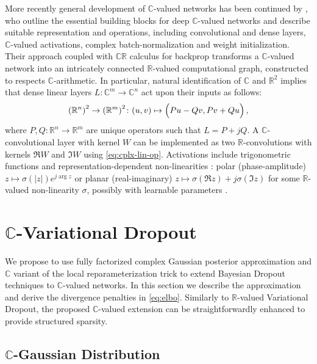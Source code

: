\documentclass[a4paper,10pt,onecolumn]{article}
\newcommand{\real}{\mathbb{R}}
\newcommand{\cplx}{\mathbb{C}}
\begin{document}
More recently general development of $\cplx$-valued networks has been continued by
\citet{trabelsi_deep_2017}, who outline the essential building blocks for deep $\cplx$-valued
networks and describe suitable representation and operations, including convolutional and
dense layers, $\cplx$-valued activations, complex batch-normalization and weight initialization.
Their approach coupled with $\cplx\real$ calculus for backprop transforms a $\cplx$-valued
network into an intricately connected $\real$-valued computational graph, constructed
to respects $\cplx$-arithmetic.
%
In particular, natural identification of $\cplx$ and $\real^2$ implies that dense linear
layers $
  L \colon \cplx^m \to \cplx^n
$ act upon their inputs as follows:
\begin{equation}  \label{eq:cplx-lin-op}
  {(\real^n)}^{2}
    \to {(\real^m)}^{2}
    \colon (u, v)
      \mapsto \Bigl(
        P u - Q v,
        P v + Q u
      \Bigr)
    \,,
\end{equation}
where $
  P, Q \colon \real^{n} \to \real^{m}
$ are unique operators such that $L = P + j Q$. A $\cplx$-convolutional layer with kernel
$W$ can be implemented as two $\real$-convolutions with kernels $\Re{W}$ and $\Im{W}$ using
\eqref{eq:cplx-lin-op}. Activations include trigonometric functions and representation-dependent
non-linearities \citep{hirose_complex-valued_2009}: polar (phase-amplitude) $
  z \mapsto \sigma(\lvert z \rvert) e^{j \arg z}
$ or planar (real-imaginary) $
  z \mapsto \sigma(\Re z) + j \sigma(\Im z)
$ for some $\real$-valued non-linearity $\sigma$, possibly with learnable parameters
\citep{trabelsi_deep_2017,wolter_complex_2018}.



\section{$\cplx$-Variational Dropout} %
\label{sec:c_variational_dropout}

We propose to use fully factorized complex Gaussian posterior approximation and $\cplx$
variant of the local reparameterization trick to extend Bayesian Dropout techniques to
$\cplx$-valued networks. In this section we describe the approximation and derive the
divergence penalties in \eqref{eq:elbo}. Similarly to $\real$-valued Variational Dropout,
the proposed $\cplx$-valued extension can be straightforwardly enhanced to provide
structured sparsity.


\subsection{$\cplx$-Gaussian Distribution} %
\label{sub:c_gauss_and_local_rep}
\end{document}
